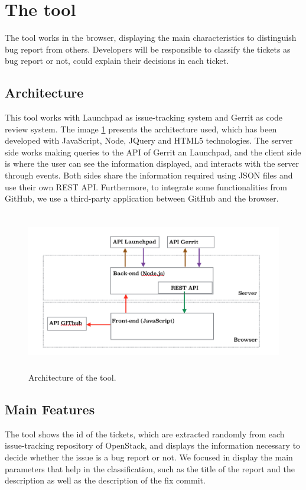 \documentclass[ifip]{svmult}
\begin{document}
\section{The tool}
\label{sec:2}

The tool works in the browser, displaying the main characteristics to distinguish bug report from others. Developers will be responsible to classify the tickets as bug report or not, could explain their decisions in each ticket.


\subsection{Architecture}

This tool works with Launchpad as issue-tracking system and Gerrit as code review system. The image \ref{fig:1} presents the architecture used, which has been developed with JavaScript, Node, JQuery and HTML5 technologies. The server side works making queries to the API of Gerrit an Launchpad, and the client side is where the user can see the information displayed, and interacts with the server through events. Both sides share the information required using JSON files and use their own REST API. Furthermore, to integrate some functionalities from GitHub, we use a third-party application between GitHub and the browser.

\label{sec:2.1}
\begin{figure}
\centering
\includegraphics[height=7cm]{Arquitectura.png}
\caption{Architecture of the tool.}
\label{fig:1}       %
\end{figure}

\subsection{Main Features}
\label{sec:2.2}
The tool shows the id of the tickets, which are extracted randomly from each issue-tracking repository of OpenStack, and displays the information necessary to decide whether the issue is a bug report or not. We focused in display the main parameters that help in the classification, such as the title of the report and the description as well as the description of the fix commit.
\end{document}
